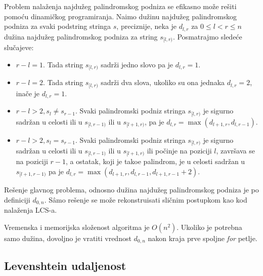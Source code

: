 Problem nala\v zenja najdu\v zeg palindromskog podniza se efikasno mo\v ze re\v siti pomo\' cu dinami\v ckog programiranja. Na\dj imo du\v zinu najdu\v zeg palindromskog podniza za svaki podstring stringa $s$, preciznije, neka je $d_{l,r}$ za $0 \leq l < r \leq n$ du\v zina najdu\v zeg palindromskog podniza za string $s_{[l,r)}$. Posmatrajmo slede\' ce slu\v cajeve:

\begin{itemize}
    \item $r-l = 1$. Tada string $s_{[l,r)}$ sadr\v zi jedno slovo pa je $d_{l,r} = 1$.
    \item $r-l = 2$. Tada string $s_{[l,r)}$ sadr\v zi dva slova, ukoliko su ona jednaka $d_{l,r} = 2$, ina\v ce je $d_{l,r} = 1$.
    \item $r-l > 2, s_l \not = s_{r-1}$. Svaki palindromski podniz stringa $s_{[l, r)}$ je sigurno sadr\v zan u celosti ili u $s_{[l, r-1)}$ ili u $s_{[l+1, r)}$, pa je $d_{l,r} = \max(d_{l+1,r}, d_{l,r-1})$.
    \item $r-l > 2, s_l = s_{r-1}$. Svaki palindromski podniz stringa $s_{[l, r)}$ je sigurno sadr\v zan u celosti ili u $s_{[l, r-1)}$ ili u $s_{[l+1, r)}$ ili po\v cinje na poziciji $l$, zavr\v sava se na poziciji $r-1$, a ostatak, koji je tako\dj e palindrom, je u celosti sadr\v zan u $s_{[l+1,r-1)}$ pa je $d_{l,r} = \max(d_{l+1,r}, d_{l,r-1}, d_{l+1,r-1}+2)$.
\end{itemize}

Re\v senje glavnog problema, odnosno du\v zina najdu\v zeg palindromskog podniza je po definiciji $d_{0,n}$. S\^amo re\v senje se mo\v ze rekonstruisati sli\v cnim postupkom kao kod nala\v zenja LCS-a.

\noindent
\begin{minipage}[l]{\textwidth}

\end{minipage}

Vremenska i memorijska slo\v zenost algoritma je $O(n^2)$. Ukoliko je potrebna samo du\v zina, dovoljno je vratiti vrednost $d_{0,n}$ nakon kraja prve spoljne \textit{for} petlje.

\subsection{Levenshtein udaljenost}